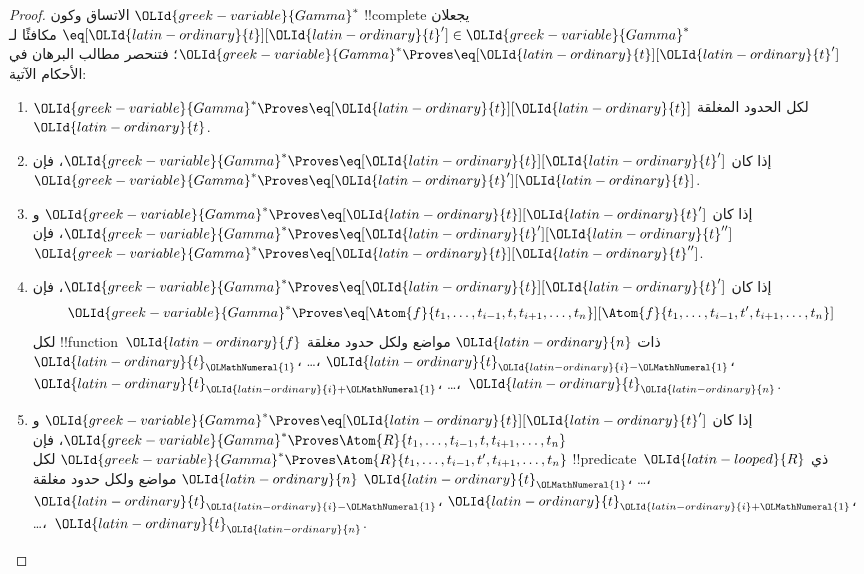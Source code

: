 \documentclass[../../../include/open-logic-section]{subfiles}
\begin{document}
\begin{proof}
الاتساق وكون $\OLId{greek-variable}{Gamma}^*$ !!{complete} يجعلان $\eq[\OLId{latin-ordinary}{t}][\OLId{latin-ordinary}{t}'] \in
\OLId{greek-variable}{Gamma}^*$ مكافئًا لـ$\OLId{greek-variable}{Gamma}^* \Proves \eq[\OLId{latin-ordinary}{t}][\OLId{latin-ordinary}{t}']$؛ فتنحصر مطالب
البرهان في الأحكام الآتية:
\begin{enumerate}
\item $\OLId{greek-variable}{Gamma}^* \Proves \eq[\OLId{latin-ordinary}{t}][\OLId{latin-ordinary}{t}]$ لكل الحدود المغلقة~$\OLId{latin-ordinary}{t}$.
\item إذا كان $\OLId{greek-variable}{Gamma}^* \Proves \eq[\OLId{latin-ordinary}{t}][\OLId{latin-ordinary}{t}']$، فإن
  $\OLId{greek-variable}{Gamma}^* \Proves \eq[\OLId{latin-ordinary}{t}'][\OLId{latin-ordinary}{t}]$.
\item إذا كان $\OLId{greek-variable}{Gamma}^* \Proves \eq[\OLId{latin-ordinary}{t}][\OLId{latin-ordinary}{t}']$ و$\OLId{greek-variable}{Gamma}^* \Proves
  \eq[\OLId{latin-ordinary}{t}'][\OLId{latin-ordinary}{t}'']$، فإن $\OLId{greek-variable}{Gamma}^* \Proves \eq[\OLId{latin-ordinary}{t}][\OLId{latin-ordinary}{t}'']$.
\item إذا كان $\OLId{greek-variable}{Gamma}^* \Proves \eq[\OLId{latin-ordinary}{t}][\OLId{latin-ordinary}{t}']$، فإن
\[
\OLId{greek-variable}{Gamma}^* \Proves
\eq[\Atom{f}{t_1,\dots,t_{i-1},t,t_{i+1},\dots,t_n}][\Atom{f}{t_1,\dots,t_{i-1},t',t_{i+1},\dots,t_n}]
\]
لكل !!{function}~$\OLId{latin-ordinary}{f}$ ذات $\OLId{latin-ordinary}{n}$ مواضع ولكل حدود مغلقة $\OLId{latin-ordinary}{t}_\OLMathNumeral{1}$، \dots،
$\OLId{latin-ordinary}{t}_{\OLId{latin-ordinary}{i}-\OLMathNumeral{1}}$، $\OLId{latin-ordinary}{t}_{\OLId{latin-ordinary}{i}+\OLMathNumeral{1}}$، \dots،~$\OLId{latin-ordinary}{t}_\OLId{latin-ordinary}{n}$.
\item إذا كان $\OLId{greek-variable}{Gamma}^* \Proves \eq[\OLId{latin-ordinary}{t}][\OLId{latin-ordinary}{t}']$ و
$\OLId{greek-variable}{Gamma}^* \Proves
\Atom{R}{t_1,\dots,t_{i-1},t,t_{i+1},\dots,t_n}$، فإن
$\OLId{greek-variable}{Gamma}^* \Proves \Atom{R}{t_1,\dots,t_{i-1},t',t_{i+1},\dots,t_n}$
لكل !!{predicate}~$\OLId{latin-looped}{R}$ ذي $\OLId{latin-ordinary}{n}$ مواضع ولكل حدود مغلقة $\OLId{latin-ordinary}{t}_\OLMathNumeral{1}$، \dots،
$\OLId{latin-ordinary}{t}_{\OLId{latin-ordinary}{i}-\OLMathNumeral{1}}$، $\OLId{latin-ordinary}{t}_{\OLId{latin-ordinary}{i}+\OLMathNumeral{1}}$، \dots،~$\OLId{latin-ordinary}{t}_\OLId{latin-ordinary}{n}$.
\end{enumerate}
\end{proof}
\end{document}

